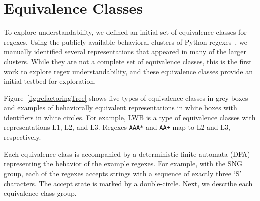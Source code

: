 \section{Equivalence Classes}
\label{sec:refactoring}
To explore understandability, we defined an initial set of equivalence classes for regexes.
Using the publicly available behavioral clusters of Python regexes~\cite{chapman2016}, we manually identified several representations that appeared in many of the larger clusters.
While they are not a complete set of equivalence classes, this is the first work to explore regex understandability, and these equivalence classes provide an initial testbed for exploration.

Figure~\ref{fig:refactoringTree} shows five types of equivalence classes in grey boxes and examples of behaviorally equivalent {representations} in white boxes with identifiers in white circles. For example, LWB is a type of equivalence classes with representations L1, L2, and L3. Regexes \verb!AAA*! and \verb!AA+! map to L2 and L3, respectively.

Each equivalence class is accompanied by a deterministic finite automata (DFA) representing the behavior of the example regexes. For example, with the SNG group, each of the regexes accepts strings with a sequence of exactly three `S' characters. The accept state is marked by a double-circle.
Next, we describe each equivalence class group.

